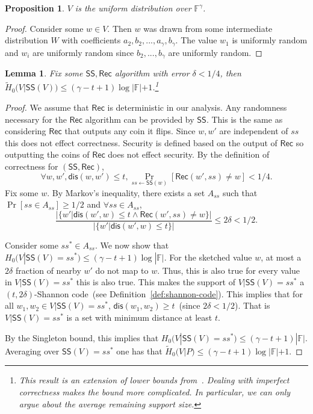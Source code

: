\documentclass[11pt]{article}
\newcommand{\defref}[1]{\mbox{Definition~\ref{#1}}}
\newcommand{\class}[1]{{\ensuremath{\mathsf{#1}}}}
\newcommand{\sketch}{\ensuremath{\class{SS}}\xspace}
\newcommand{\rec}{\ensuremath{\class{Rec}}\xspace}
\newcommand{\dis}{\ensuremath{\mathsf{dis}}}
\newtheorem{lemma}[theorem]{Lemma}
\newtheorem{proposition}[theorem]{Proposition}
\begin{document}
\begin{proposition}
\label{prop:distribution uniform} $V$ is the uniform distribution over $\mathbb{F}^\gamma$.
\end{proposition}
\begin{proof}
Consider some $w\in V$.  Then $w$ was drawn from some intermediate distribution $W$ with coefficients $a_2, b_2, ..., a_\gamma , b_\gamma$.  The value $w_1$ is uniformly random and $w_i$ are uniformly random since $b_2,..., b_\gamma$ are uniformly random.
\end{proof}


\begin{lemma}
\label{lem:secure sketch entropy loss}
Fix some $\sketch, \rec$ algorithm with error $\delta < 1/4$, then $\tilde{H}_0(V | \sketch(V)) \le (\gamma-t+1)\log |\mathbb{F}|+1$.\footnote{This result is an extension of lower bounds from~\cite[Appendix C]{DBLP:journals/siamcomp/DodisORS08}.  Dealing with imperfect correctness makes the bound more complicated.  In particular, we can only argue about the average remaining support size.}
\end{lemma}
\begin{proof}
We assume that $\rec$ is deterministic in our analysis.  Any randomness necessary for the \rec algorithm can be provided by \sketch.  This is the same as considering $\rec$ that outputs any coin it flips.  Since $w, w'$ are independent of $ss$ this does not effect correctness.  Security is defined based on the output of $\rec$ so outputting the coins of $\rec$ does not effect security.
By the definition of correctness for $(\sketch, \rec)$, 
\[
\forall w, w', \dis(w, w') \le t, \Pr_{ss\leftarrow \sketch(w)} [\rec(w', ss) \neq w] < 1/4.
\]
Fix some $w$.  
By Markov's inequality, there exists a set $A_{ss}$ such that $\Pr[ss\in A_{ss}]\ge 1/2$ and $\forall ss\in A_{ss}$, 
\[
\frac{|\{w' | \dis (w', w)\le t \wedge \rec(w', ss) \neq w\}|}{|\{w'|\dis(w', w) \le t\}|}\le 2\delta < 1/2.\]

Consider some $ss^*\in A_{ss}$.  We now show that $H_0(V | \sketch(V) = ss^*) \le (\gamma-t+1)\log |\mathbb{F}|$.  For the sketched value $w$, at most a $2\delta$ fraction of nearby $w'$ do not map to $w$. Thus, this is also true for every value in $V|\sketch(V) = ss^*$ this is also true.    This makes the support of $V|\sketch(V)=ss^*$ a $(t, 2\delta)$-Shannon code~(see \defref{def:shannon-code}).  This implies that for all $w_1, w_2 \in V|\sketch(V)=ss^*$, $\dis(w_1, w_2)\ge t$~(since $2\delta< 1/2$).  That is $V|\sketch(V)=ss^*$ is a set with minimum distance at least $t$.  


By the Singleton bound, this implies that $H_0(V |\sketch(V)=ss^*) \le (\gamma -t+1 )|\mathbb{F}|$.  Averaging over $\sketch(V)=ss^*$ one has that $\tilde{H}_0(V|P) \le (\gamma -t +1) \log|\mathbb{F}| +1$.
\end{proof}
\end{document}
